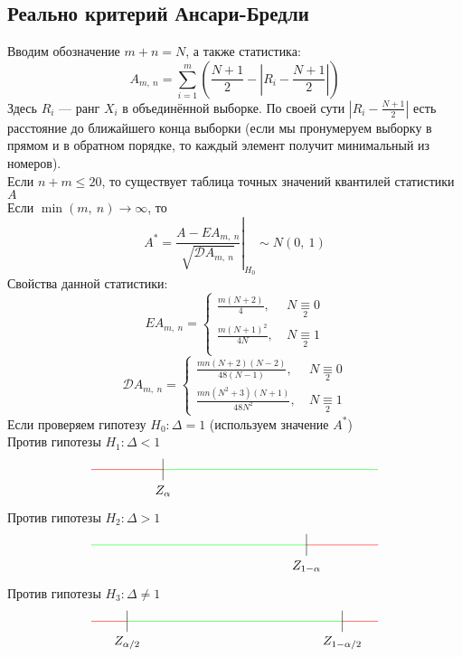 \documentclass[12pt, a4paper]{article}
\newcommand{\dev}{\mathcal{D}}
\begin{document}
\subsection*{Реально критерий Ансари-Бредли}
Вводим обозначение $m + n = N$, а также статистика:
\[A_{m,\ n} = \sum_{i = 1}^{m} \left( \frac{N + 1}{2} - \left| R_i - \frac{N + 1}{2} \right| \right)\]
Здесь $R_i$ --- ранг $X_i$ в объединённой выборке. По своей сути $\left| R_i - \frac{N + 1}{2} \right|$ есть расстояние до ближайшего конца выборки (если мы пронумеруем выборку в прямом и в обратном порядке, то каждый элемент получит минимальный из номеров).\\
Если $n + m \leq 20$, то существует таблица точных значений квантилей статистики $A$\\
Если $\min(m,\ n) \to \infty$, то
\[A^* = \left.\frac{A - EA_{m,\ n}}{\sqrt{\dev A_{m,\ n}}}\right|_{H_0} \sim N(0,\ 1)\]
Свойства данной статистики:
\[EA_{m,\ n} = \begin{cases}
    \frac{m(N + 2)}{4},\ & N \underset{2}{\equiv} 0\\
    \frac{m(N + 1)^2}{4N},\ & N \underset{2}{\equiv} 1\\
\end{cases}\]
\[\dev A_{m,\ n} = \begin{cases}
    \frac{mn(N + 2)(N - 2)}{48(N - 1)},\ & N \underset{2}{\equiv} 0\\
    \frac{mn(N^2 + 3)(N + 1)}{48 {N}^2},\   & N \underset{2}{\equiv} 1
\end{cases}\]
Если проверяем гипотезу $H_0: \Delta = 1$ (используем значение $A^*$)\\
Против гипотезы $H_1: \Delta < 1$
\[\begin{tikzpicture}[scale = 2]
    \draw[color=green] (-1, 0) -- (2, 0);
    \draw[color=red] (-2, 0) -- (-1, 0);
    \draw (-1, -0.15) -- (-1, 0.15);
    \node at (-1, -0.3) (a) {$Z_{\alpha}$};
\end{tikzpicture}\]
Против гипотезы $H_2: \Delta > 1$
\[\begin{tikzpicture}[scale = 2]
    \draw[color=green] (-2, 0) -- (1, 0);
    \draw[color=red] (1, 0) -- (2, 0);
    \draw (1, 0.15) -- (1, -0.15);
    \node at (1, -0.3) (a) {$Z_{1 - \alpha}$};
\end{tikzpicture}\]
Против гипотезы $H_3: \Delta \neq 1$
\[\begin{tikzpicture}[scale = 2]
    \draw[color=red] (-2, 0) -- (-1.5, 0);
    \draw[color=red] (1.5, 0) -- (2, 0);
    \draw[color=green] (-1.5, 0) -- (1.5, 0);
    \draw (1.5, -0.15) -- (1.5, 0.15);
    \draw (-1.5, -0.15) -- (-1.5, 0.15);
    \node at(-1.5, -0.3) (a) {$Z_{\alpha/2}$};
    \node at(1.5, -0.3) (a) {$Z_{1 - \alpha/2}$};
\end{tikzpicture}\]
\end{document}
